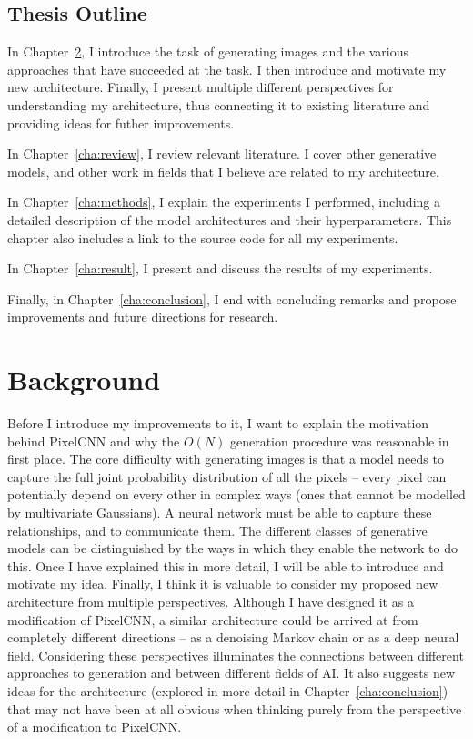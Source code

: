\documentclass[11pt, a4paper, openany]{book}
\begin{document}
\section{Thesis Outline}
\label{sec:outline}
In Chapter~\ref{cha:background}, I introduce the task of generating images and the various approaches that have succeeded at the task. I then introduce and motivate my new architecture. Finally, I present multiple different perspectives for understanding my architecture, thus connecting it to existing literature and providing ideas for futher improvements.

In Chapter~\ref{cha:review}, I review relevant literature. I cover other generative models, and other work in fields that I believe are related to my architecture.

In Chapter~\ref{cha:methods}, I explain the experiments I performed, including a detailed description of the model architectures and their hyperparameters. This chapter also includes a link to the source code for all my experiments.

In Chapter~\ref{cha:result}, I present and discuss the results of my experiments.

Finally, in Chapter~\ref{cha:conclusion}, I end with concluding remarks and propose improvements and future directions for research.

\chapter{Background}
\label{cha:background}
Before I introduce my improvements to it, I want to explain the motivation behind PixelCNN and why the $O(N)$ generation procedure was reasonable in first place. The core difficulty with generating images is that a model needs to capture the full joint probability distribution of all the pixels -- every pixel can potentially depend on every other in complex ways (ones that cannot be modelled by multivariate Gaussians). A neural network must be able to capture these relationships, and to communicate them. The different classes of generative models can be distinguished by the ways in which they enable the network to do this. Once I have explained this in more detail, I will be able to introduce and motivate my idea. Finally, I think it is valuable to consider my proposed new architecture from multiple perspectives. Although I have designed it as a modification of PixelCNN, a similar architecture could be arrived at from completely different directions -- as a denoising Markov chain or as a deep neural field. Considering these perspectives illuminates the connections between different approaches to generation and between different fields of AI. It also suggests new ideas for the architecture (explored in more detail in Chapter~\ref{cha:conclusion}) that may not have been at all obvious when thinking purely from the perspective of a modification to PixelCNN.
\end{document}
